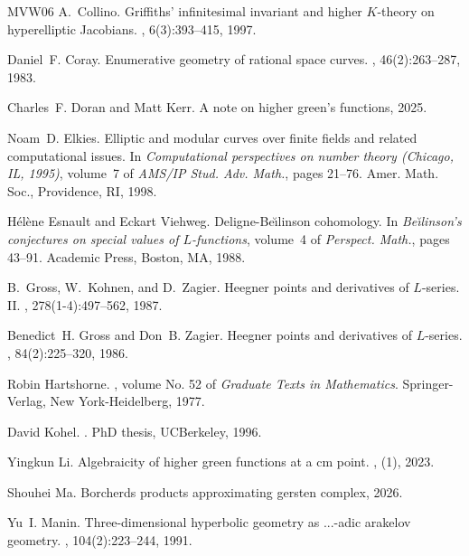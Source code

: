 \documentclass[11pt,a4paper]{article}
\begin{document}
\begin{thebibliography}{MVW06}
A.~Collino.
\newblock Griffiths' infinitesimal invariant and higher {$K$}-theory on
  hyperelliptic {J}acobians.
, 6(3):393--415, 1997.

Daniel~F. Coray.
\newblock Enumerative geometry of rational space curves.
, 46(2):263--287, 1983.

Charles~F. Doran and Matt Kerr.
\newblock A note on higher green's functions, 2025.

Noam~D. Elkies.
\newblock Elliptic and modular curves over finite fields and related
  computational issues.
\newblock In {\em Computational perspectives on number theory ({C}hicago, {IL},
  1995)}, volume~7 of {\em AMS/IP Stud. Adv. Math.}, pages 21--76. Amer. Math.
  Soc., Providence, RI, 1998.

H\'{e}l\`ene Esnault and Eckart Viehweg.
\newblock Deligne-{B}e\u{\i}linson cohomology.
\newblock In {\em Be\u{\i}linson's conjectures on special values of
  {$L$}-functions}, volume~4 of {\em Perspect. Math.}, pages 43--91. Academic
  Press, Boston, MA, 1988.

B.~Gross, W.~Kohnen, and D.~Zagier.
\newblock Heegner points and derivatives of {$L$}-series. {II}.
, 278(1-4):497--562, 1987.

Benedict~H. Gross and Don~B. Zagier.
\newblock Heegner points and derivatives of {$L$}-series.
, 84(2):225--320, 1986.

Robin Hartshorne.
, volume No. 52 of {\em Graduate Texts in
  Mathematics}.
\newblock Springer-Verlag, New York-Heidelberg, 1977.

David Kohel.
.
\newblock PhD thesis, UCBerkeley, 1996.

Yingkun Li.
\newblock Algebraicity of higher green functions at a cm point.
, (1), 2023.

Shouhei Ma.
\newblock Borcherds products approximating gersten complex, 2026.

Yu~I. Manin.
\newblock Three-dimensional hyperbolic geometry as ...-adic arakelov geometry.
, 104(2):223--244, 1991.


\end{thebibliography}
\end{document}
